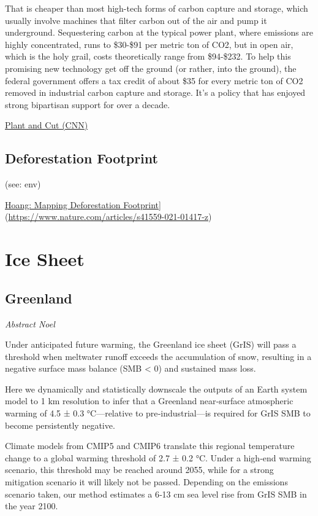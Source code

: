 \documentclass[
]{book}
\begin{document}
That is cheaper than most high-tech forms of carbon capture and storage, which usually involve machines that filter carbon out of the air and pump it underground. Sequestering carbon at the typical power plant, where emissions are highly concentrated, runs to \$30-\$91 per metric ton of CO2, but in open air, which is the holy grail, costs theoretically range from \$94-\$232. To help this promising new technology get off the ground (or rather, into the ground), the federal government offers a tax credit of about \$35 for every metric ton of CO2 removed in industrial carbon capture and storage. It's a policy that has enjoyed strong bipartisan support for over a decade.

\href{https://edition.cnn.com/2021/02/10/opinions/climate-plant-and-cut-trees-down-bader/index.html}{Plant and Cut (CNN)}

\hypertarget{deforestation-footprint}{%
\section{Deforestation Footprint}\label{deforestation-footprint}}

(see: env)

\href{Nature,\%20paywall}{Hoang: Mapping Deforestation Footprint}{]}(\url{https://www.nature.com/articles/s41559-021-01417-z})

\hypertarget{ice-sheet}{%
\chapter{Ice Sheet}\label{ice-sheet}}

\hypertarget{greenland}{%
\section{Greenland}\label{greenland}}

\emph{Abstract Noel}

Under anticipated future warming, the Greenland ice sheet (GrIS) will
pass a threshold when meltwater runoff exceeds the accumulation of snow,
resulting in a negative surface mass balance (SMB \textless{} 0) and sustained mass loss.

Here we dynamically and statistically downscale the outputs of an
Earth system model to 1 km resolution to infer that a Greenland near‐surface
atmospheric warming of 4.5 ± 0.3 °C---relative to pre‐industrial---is required
for GrIS SMB to become persistently negative.

Climate models from CMIP5 and CMIP6 translate this regional temperature change
to a global warming threshold of 2.7 ± 0.2 °C.
Under a high‐end warming scenario, this threshold may be reached around 2055,
while for a strong mitigation scenario it will likely not be passed.
Depending on the emissions scenario taken, our method estimates a 6‐13 cm sea level rise
from GrIS SMB in the year 2100.
\end{document}
